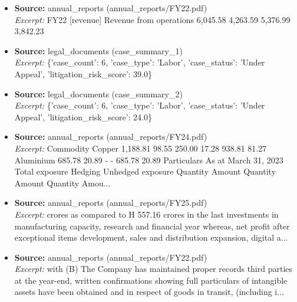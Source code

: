 \documentclass[11pt,a4paper]{article}
\begin{document}
\begin{itemize}
\item \textbf{Source:} annual\_reports (annual\_reports/FY22.pdf) \\ \textit{Excerpt:} FY22 [revenue] Revenue from operations                                  6,045.58               4,263.59            5,376.99               3,842.23
\item \textbf{Source:} legal\_documents (case\_summary\_1) \\ \textit{Excerpt:} \{'case\_count': 6, 'case\_type': 'Labor', 'case\_status': 'Under Appeal', 'litigation\_risk\_score': 39.0\}
\item \textbf{Source:} legal\_documents (case\_summary\_2) \\ \textit{Excerpt:} \{'case\_count': 6, 'case\_type': 'Labor', 'case\_status': 'Under Appeal', 'litigation\_risk\_score': 24.0\}
\item \textbf{Source:} annual\_reports (annual\_reports/FY24.pdf) \\ \textit{Excerpt:} Commodity Copper 1,188.81 98.55 250.00 17.28 938.81 81.27 Aluminium 685.78 20.89 - - 685.78 20.89 Particulars As at March 31, 2023 Total exposure Hedging Unhedged exposure Quantity Amount Quantity Amount Quantity Amou...
\item \textbf{Source:} annual\_reports (annual\_reports/FY25.pdf) \\ \textit{Excerpt:} crores as compared to H 557.16 crores in the last investments in manufacturing capacity, research and financial year whereas, net profit after exceptional items development, sales and distribution expansion, digital a...
\item \textbf{Source:} annual\_reports (annual\_reports/FY22.pdf) \\ \textit{Excerpt:} with (B) The Company has maintained proper records third parties at the year-end, written confirmations showing full particulars of intangible assets have been obtained and in respect of goods in transit, (including i...
\end{itemize}
\end{document}
